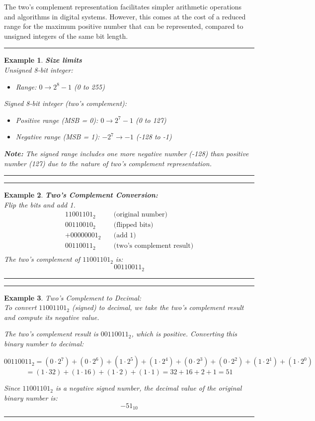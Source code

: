\documentclass[12pt]{report}
\newtheorem{example}{Example}
\newenvironment{examp}
{\vspace{0.5cm}
\hrule
\begin{example}}
{\hrule
\vspace{0.5cm}
\end{example}}
\begin{document}
The two's complement representation facilitates simpler arithmetic operations and algorithms in digital systems. However, this comes at the cost of a reduced range for the maximum positive number that can be represented, compared to unsigned integers of the same bit length.
\begin{examp}
	\textbf{Size limits} \\
	Unsigned 8-bit integer:
	\begin{itemize}
		\item Range: $0 \to 2^8 - 1$ (0 to 255)
	\end{itemize}
	Signed 8-bit integer (two's complement):
	\begin{itemize}
		\item Positive range (MSB = 0): $0 \to 2^7 - 1$ (0 to 127)
		\item Negative range (MSB = 1): $-2^7 \to -1$ (-128 to -1)
	\end{itemize}
	\noindent\textbf{Note:} The signed range includes one more negative number (-128) than positive number (127) due to the nature of two's complement representation.
\end{examp}
\begin{examp}
	\textbf{Two's Complement Conversion:} \\
	Flip the bits and add 1.
	\[
		\begin{aligned}
			11001101_2  & \quad \text{(original number)}         \\
			00110010_2  & \quad \text{(flipped bits)}            \\
			+00000001_2 & \quad \text{(add 1)}                   \\
			\hline
			00110011_2  & \quad \text{(two's complement result)} \\
		\end{aligned}
	\]
	The two's complement of \(11001101_2\) is:
	\[
		00110011_2
	\]
\end{examp}
\pagebreak
\begin{examp}
	Two's Complement to Decimal: \\
	To convert \(11001101_2\) (signed) to decimal, we take the two's complement result and compute its negative value.

	The two's complement result is \(00110011_2\), which is positive. Converting this binary number to decimal:

	\[
		00110011_2 = (0 \cdot 2^7) + (0 \cdot 2^6) + (1 \cdot 2^5) + (1 \cdot 2^4) + (0 \cdot 2^3) + (0 \cdot 2^2) + (1 \cdot 2^1) + (1 \cdot 2^0)
	\]
	\[
		= (1 \cdot 32) + (1 \cdot 16) + (1 \cdot 2) + (1 \cdot 1) = 32 + 16 + 2 + 1 = 51
	\]

	Since \(11001101_2\) is a negative signed number, the decimal value of the original binary number is:
	\[-51_{10}\]
\end{examp}
\end{document}
